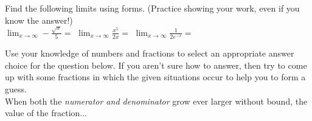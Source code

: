 \documentclass[10pt]{article}
\begin{document}
\vfill

 Find the following limits using forms. (Practice showing your work, even if you know the answer!)\\

$\displaystyle\lim_{x\to\infty} -\frac{\sqrt{x}}{5}=$ 
\hfill 
$\displaystyle\lim_{x\to\infty} \frac{x^5}{2x}=$ 
\hfill 
$\displaystyle\lim_{x\to\infty} \frac{1}{2e^{-x}}=$ 
\hfill

\vfill

\newpage%

\lform  \blue{\bf $\dfrac{\infty}{\infty}$}


 Use your knowledge of numbers and fractions to select an appropriate answer choice for the question below. If you aren't sure how to answer, then try to come up with some fractions in which the given situations occur to help you to form a guess.\\

When both the {\it numerator and denominator} grow ever larger without bound, the value of the fraction...\\
\\
\end{document}
